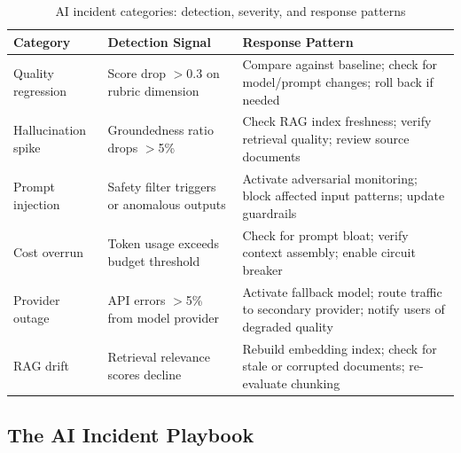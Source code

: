\begin{table}[htbp]
\centering
\caption{AI incident categories: detection, severity, and response patterns}
\label{tab:ai-incidents}
\begin{tabularx}{\textwidth}{p{2.8cm}p{2.8cm}X}
\toprule
\textbf{Category} & \textbf{Detection Signal} & \textbf{Response Pattern} \\
\midrule
Quality regression & Score drop $>$0.3 on rubric dimension & Compare against baseline; check for model/prompt changes; roll back if needed \\
\midrule
Hallucination spike & Groundedness ratio drops $>$5\% & Check RAG index freshness; verify retrieval quality; review source documents \\
\midrule
Prompt injection & Safety filter triggers or anomalous outputs & Activate adversarial monitoring; block affected input patterns; update guardrails \\
\midrule
Cost overrun & Token usage exceeds budget threshold & Check for prompt bloat; verify context assembly; enable circuit breaker \\
\midrule
Provider outage & API errors $>$5\% from model provider & Activate fallback model; route traffic to secondary provider; notify users of degraded quality \\
\midrule
RAG drift & Retrieval relevance scores decline & Rebuild embedding index; check for stale or corrupted documents; re-evaluate chunking \\
\bottomrule
\end{tabularx}
\end{table}

\subsection{The AI Incident Playbook}

